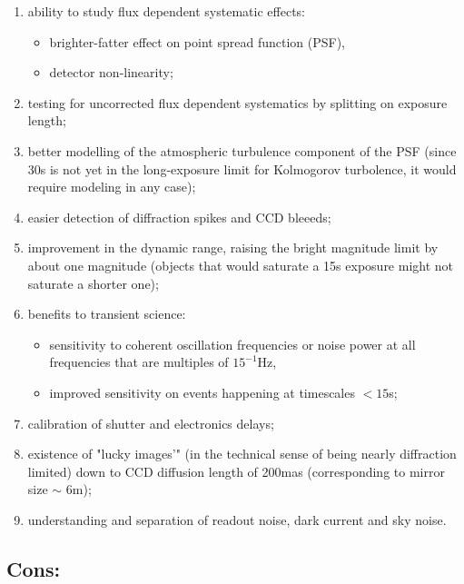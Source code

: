 \documentclass[12pt, a4paper]{article}
\begin{document}
\begin{enumerate}

\item ability to study flux dependent systematic effects:
  \begin{itemize}
  \item brighter-fatter effect on point spread function (PSF),
  \item detector non-linearity;
\end{itemize}

\item testing for uncorrected flux dependent systematics by
  splitting on exposure length;

\item better modelling of the atmospheric turbulence component of the PSF
  (since 30s is not yet in the long-exposure limit for Kolmogorov
  turbolence, it would require modeling in any case);

\item easier detection of diffraction spikes and CCD bleeeds;

\item improvement in the dynamic range, raising the bright
  magnitude limit by about one magnitude (objects that would
  saturate a 15s exposure might not saturate a shorter one);

\item benefits to transient science:
  \begin{itemize}
  \item sensitivity to coherent oscillation frequencies or noise power at all
    frequencies that are multiples  of $15^{-1}$Hz,
  \item improved sensitivity on events happening at timescales $<15$s;
  \end{itemize}

\item calibration of shutter and electronics delays;

\item existence of "lucky images'" (in the technical sense of being
  nearly diffraction limited) down to CCD diffusion length of 200mas
  (corresponding to mirror size $\sim$ 6m);

\item understanding and separation of readout noise, dark
  current and sky noise.

\end{enumerate}

\subsection*{Cons:}
\end{document}
